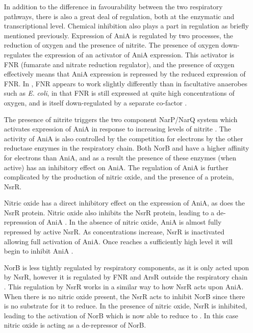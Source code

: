 In addition to the difference in favourability between the two respiratory pathways, there is also a great deal of regulation, both at the enzymatic and transcriptional level. Chemical inhibition also plays a part in regulation as briefly mentioned previously. Expression of AniA is regulated by two processes, the reduction of oxygen and the presence of nitrite. The presence of oxygen down-regulates the expression of an activator of AniA expression. This activator is FNR (fumarate and nitrate reduction regulator), and the presence of oxygen effectively means that AniA expression is repressed by the reduced expression of FNR. In \Nm, FNR appears to work slightly differently than in facultative anaerobes such as \textit{E. coli}, in that FNR is still expressed at quite high concentrations of oxygen, and is itself down-regulated by a separate co-factor \cite{Rock2007}.

The presence of nitrite triggers the two component NarP/NarQ system which activates expression of AniA in response to increasing levels of nitrite \cite{Rock2005}. The activity of AniA is also controlled by the competition for electrons by the other reductase enzymes in the respiratory chain. Both NorB and \cbbthree{} have a higher affinity for electrons than AniA, and as a result the presence of these enzymes (when active) has an inhibitory effect on AniA. The regulation of AniA is further complicated by the production of nitric oxide, and the presence of a protein, NsrR.

Nitric oxide has a direct inhibitory effect on the expression of AniA, as does the NsrR protein. Nitric oxide also inhibits the NsrR protein, leading to a de-represssion of AniA \cite{Heurlier2008}. In the absence of nitric oxide, AniA is almost fully repressed by active NsrR. As \cNO\space concentrations increase, NsrR is inactivated allowing full activation of AniA. Once \cNO\space reaches a sufficiently high level it will begin to inhibit AniA \cite{Rock2005,Rock2007}.

NorB is less tightly regulated by respiratory components, as it is only acted upon by NsrR, however it is regulated by FNR and ArsR outside the respiratory chain \cite{VincentIsabella01012008}. This regulation by NsrR works in a similar way to how NsrR acts upon AniA. When there is no nitric oxide present, the NsrR acts to inhibit NorB since there is no substrate for it to reduce. In the presence of nitric oxide, NsrR is inhibited, leading to the activation of NorB which is now able to reduce \cNO\space to \cNtwoO. In this case nitric oxide is acting as a de-repressor of NorB.

